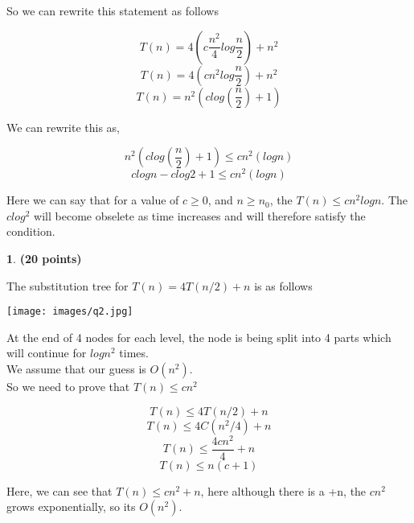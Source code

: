 \documentclass[11pt]{article}
\theoremstyle{definition}
\newtheorem{prob}{}
\newcommand{\solution}{\medskip\noindent{\color{DarkBlue}\textbf{Solution:}}}
\begin{document}
\begin{enumerate}
    So we can rewrite this statement as follows

    \[ T(n) = 4(c\frac{n^2}{4}log\frac{n}{2}) + n^2\]
    \[ T(n) = 4(cn^2log\frac{n}{2}) + n^2\]
    \[ T(n) = n^2(clog(\frac{n}{2})+1) \]

    We can rewrite this as,

    \[ n^2(clog(\frac{n}{2})+1) \leq cn^2(logn) \]
    \[ clogn - clog2 +1 \leq cn^2(logn) \]

    Here we can say that for a value of $ c\geq 0 $, and $ n \geq n_0 $, the $ T(n) \leq cn^2logn$. The $clog^2$ will become
    obselete as time increases and will therefore satisfy the condition.

\end{enumerate}

\begin{prob} \textbf{(20 points)}
\end{prob}
\solution

The substitution tree for $T(n) = 4T(n/2) + n$ is as follows

\texttt{[image: images/q2.jpg]}

At the end of 4 nodes for each level, the node is being split into 4 parts which will continue for $logn^2$ times. \\

We assume that our guess is $O(n^2)$.\\

So we need to prove that $T(n) \leq cn^2$

\[ T(n) \leq 4T(n/2) + n \]
\[ T(n) \leq 4C(n^2/4) + n \]
\[ T(n) \leq \frac{4cn^2}{4} + n \]
\[ T(n) \leq n(c+1) \]

Here, we can see that $T(n) \leq cn^2+n$, here although there is a +n, the $cn^2$ grows exponentially, so its $O(n^2)$.
\end{document}
